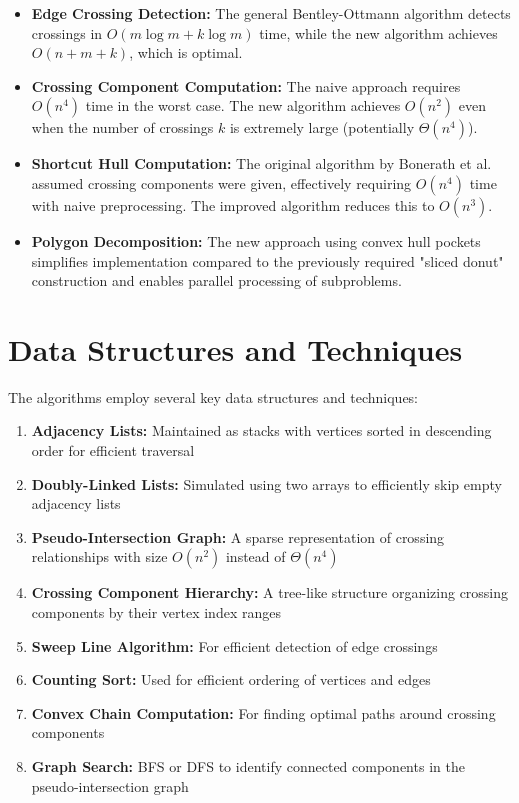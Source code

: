 \documentclass[10pt,letterpaper]{article}
\begin{document}
\begin{itemize}
    \item \textbf{Edge Crossing Detection:} The general Bentley-Ottmann algorithm detects crossings in $O(m \log m + k \log m)$ time, while the new algorithm achieves $O(n + m + k)$, which is optimal.
    
    \item \textbf{Crossing Component Computation:} The naive approach requires $O(n^4)$ time in the worst case. The new algorithm achieves $O(n^2)$ even when the number of crossings $k$ is extremely large (potentially $\Theta(n^4)$).
    
    \item \textbf{Shortcut Hull Computation:} The original algorithm by Bonerath et al. assumed crossing components were given, effectively requiring $O(n^4)$ time with naive preprocessing. The improved algorithm reduces this to $O(n^3)$.
    
    \item \textbf{Polygon Decomposition:} The new approach using convex hull pockets simplifies implementation compared to the previously required "sliced donut" construction and enables parallel processing of subproblems.
\end{itemize}

\section{Data Structures and Techniques}

The algorithms employ several key data structures and techniques:

\begin{enumerate}
    \item \textbf{Adjacency Lists:} Maintained as stacks with vertices sorted in descending order for efficient traversal
    
    \item \textbf{Doubly-Linked Lists:} Simulated using two arrays to efficiently skip empty adjacency lists
    
    \item \textbf{Pseudo-Intersection Graph:} A sparse representation of crossing relationships with size $O(n^2)$ instead of $\Theta(n^4)$
    
    \item \textbf{Crossing Component Hierarchy:} A tree-like structure organizing crossing components by their vertex index ranges
    
    \item \textbf{Sweep Line Algorithm:} For efficient detection of edge crossings
    
    \item \textbf{Counting Sort:} Used for efficient ordering of vertices and edges
    
    \item \textbf{Convex Chain Computation:} For finding optimal paths around crossing components
    
    \item \textbf{Graph Search:} BFS or DFS to identify connected components in the pseudo-intersection graph
\end{enumerate}
\end{document}
